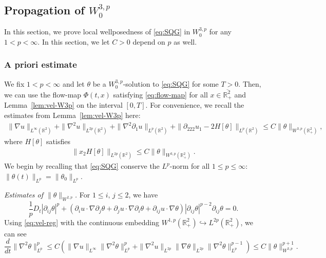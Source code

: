 \documentclass[10pt]{amsart}
\theoremstyle{definition}
\theoremstyle{remark}
\numberwithin{equation}{section}
\newcommand{\rd}{\partial}
\newcommand{\0}{\emptyset}
\newcommand{\ohp}{\overline{\bbR^2_+}}
\newcommand{\tht}{\theta}
\newcommand{\bbR}{\mathbb R}
\begin{document}
		
		
		\subsection{Propagation of $W^{3,p}_0$  }\label{subsec:W3p}
		In this section, we prove local wellposedness of \eqref{eq:SQG} in $W^{3,p}_{0}$ for any $1 < p < \infty$. In this section, we let $C>0$ depend on $p$ as well.
		
		\subsubsection{A priori estimate}\label{subsec:a}
		We fix $1 < p < \infty$ and let $\tht$ be a $W^{3,p}_{0}$-solution to \eqref{eq:SQG} for some $T>0$. Then, we can use the flow-map $\Phi(t,x)$ satisfying \eqref{eq:flow-map} for all $x \in \ohp$ and Lemma~\ref{lem:vel-W3p} on the interval $[0,T]$. For convenience, we recall the estimates from Lemma~\ref{lem:vel-W3p} here: \begin{equation}\label{eq:vel-reg2}
			\begin{aligned}
				\| \nabla u \|_{L^{\infty}(\bbR^2)} + \| \nabla^2 u \|_{L^{2p}(\bbR^2)} + \| \nabla^2 \partial_1 u \|_{L^{p}(\bbR^{2})} + 	\| \rd_{222}u_1 - 2H[\tht] \|_{L^{p}(\bbR^{2})} \leq C \| \tht \|_{W^{3,p}(\bbR^2_{+})},
			\end{aligned}
		\end{equation}  where $H[\tht]$ satisfies \begin{equation}\label{eq:H2p2}
			\begin{aligned}
				\| x_2 H[\tht] \|_{L^{2p}(\bbR^2)}  \leq C \|   \tht \|_{W^{3,p}(\bbR^2_{+})}.
			\end{aligned}
		\end{equation} We begin by recalling that \eqref{eq:SQG} conserve the $L^p$-norm  for all $1 \leq p \leq \infty$: $\| \tht(t) \|_{L^p} = \| \tht_0 \|_{L^p}.$	\medskip 
		
		\noindent \textit{Estimates of $\| \tht \|_{W^{2,p}}$.} For $1 \leq i,\,j \leq 2$, we have \begin{equation*}
			\frac{1}{p} D_t|\rd_{ij}\tht|^p + (\rd_{i} u \cdot \nabla \rd_{j} \tht + \rd_{j} u \cdot \nabla \rd_{i} \tht + \rd_{ij} u \cdot \nabla \tht) |\rd_{ij} \tht|^{p-2} \rd_{ij}\tht = 0.
		\end{equation*} Using \eqref{eq:vel-reg} with the continuous embedding $W^{1,p}(\bbR^2_{+}) \hookrightarrow L^{2p}(\bbR^2_{+})$, we can see \begin{equation*}
			\frac{d}{dt} \| \nabla^2 \tht \|_{L^p}^p \leq C \left( \| \nabla u \|_{L^{\infty}} \| \nabla^2 \tht \|_{L^p}^p + \| \nabla^2 u \|_{L^{2p}} \| \nabla \tht \|_{L^{2p}} \| \nabla^2 \tht \|_{L^p}^{p-1} \right) \le C \| \tht \|_{W^{3,p}}^{p+1}.
		\end{equation*}  	\medskip 
		
\end{document}
